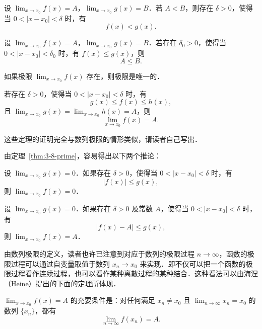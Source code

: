 \begin{theorem}[局部保序性]\label{thm:3-5-prime}
设 $\lim_{x \to x_0} f(x) = A$，$\lim_{x \to x_0} g(x) = B$．若 $A < B$，则存在 $\delta > 0$，使得当 $0 < |x - x_0| < \delta$ 时，有
\[
f(x) < g(x).
\]
\end{theorem}

\begin{theorem}[极限不等式]\label{thm:3-6-prime}
设 $\lim_{x \to x_0} f(x) = A$，$\lim_{x \to x_0} g(x) = B$．若存在 $\delta_0 > 0$，使得当 $0 < |x - x_0| < \delta_0$ 时，有 $f(x) \leqslant g(x)$，则
\[
A \leqslant B.
\]
\end{theorem}

\begin{theorem}[极限唯一性]\label{thm:3-7-prime}
如果极限 $\lim_{x \to x_0} f(x)$ 存在，则极限是唯一的．
\end{theorem}

\begin{theorem}[夹迫性]\label{thm:3-8-prime}
若存在 $\delta > 0$，使得当 $0 < |x - x_0| < \delta$ 时，有
\[
g(x) \leqslant f(x) \leqslant h(x),
\]
且 $\lim_{x \to x_0} g(x) = \lim_{x \to x_0} h(x) = A$，则
\[
\lim_{x \to x_0} f(x) = A.
\]
\end{theorem}

这些定理的证明完全与数列极限的情形类似，请读者自己写出．

由定理~\ref{thm:3-8-prime}，容易得出以下两个推论：

\begin{corollary}\label{cor:3-3-prime}
设 $\lim_{x \to x_0} g(x) = 0$．如果存在 $\delta > 0$，使得当 $0 < |x - x_0| < \delta$ 时，有
\[
|f(x)| \leqslant g(x),
\]
则 $\lim_{x \to x_0} f(x) = 0$．
\end{corollary}

\begin{corollary}\label{cor:3-4}
设 $\lim_{x \to x_0} g(x) = 0$．如果存在 $\delta > 0$ 及常数 $A$，使得当 $0 < |x - x_0| < \delta$ 时，有
\[
|f(x) - A| \leqslant g(x),
\]
则 $\lim_{x \to x_0} f(x) = A$．
\end{corollary}

由数列极限的定义，读者也许已注意到对应于数列的极限过程 $n \to \infty$，函数的极限过程可以通过自变量取值于数列 $x_n \to x_0$ 来实现．即不仅可以把一个函数的极限过程看作连续过程，也可以看作某种离散过程的某种结合．这种看法可以由海涅（Heine）提出的下面的定理所体现．

\begin{theorem}\label{thm:3-10}
$\lim_{x \to x_0} f(x) = A$ 的充要条件是：对任何满足 $x_n \neq x_0$ 且 $\lim_{n \to \infty} x_n = x_0$ 的数列 $\{x_n\}$，都有
\[
\lim_{n \to \infty} f(x_n) = A.
\]
\end{theorem}

